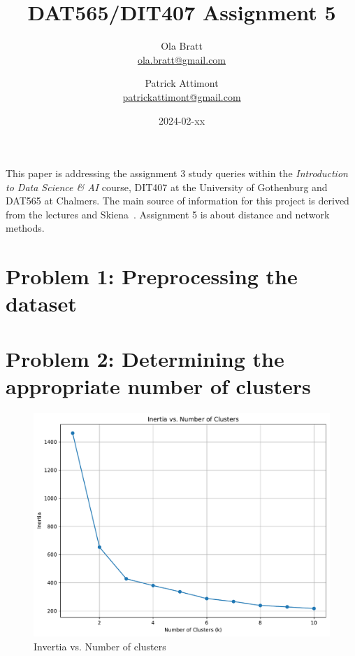 \documentclass[a4paper]{article}
\begin{document}
\author{Ola Bratt \\
  \href{mailto:ola.bratt@gmail.com}{ola.bratt@gmail.com}
  \and
  Patrick Attimont \\
  \href{patrickattimont@gmail.com}{patrickattimont@gmail.com}
}

\title{DAT565/DIT407 Assignment 5}
\date{2024-02-xx}

\maketitle

This paper is addressing the assignment 3 study queries within the \emph{Introduction to Data Science \& AI} course, DIT407 at 
the University of Gothenburg and DAT565 at Chalmers. The main source of information for this project
is derived from the lectures and Skiena~\cite{Skiena:2024}. Assignment 5 is about distance and network methods.

\section*{Problem 1: Preprocessing the dataset}

\section*{Problem 2: Determining the appropriate number of clusters}

\begin{figure}[H]
  \begin{center}
    \includegraphics[width=\textwidth]{ola/intertia.pdf}
    \caption{Invertia vs. Number of clusters}
    \label{fig:inertia}
  \end{center}
\end{figure}
\end{document}
